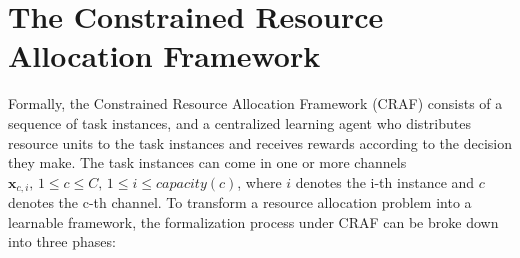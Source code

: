 \documentclass[conference]{IEEEtran}
\begin{document}
%
%
%
%
%


\section{The Constrained Resource Allocation Framework}

Formally, the Constrained Resource Allocation Framework (CRAF) consists of a sequence of task instances, and a centralized learning agent who distributes resource units to the task instances and receives rewards according to the decision they make. The task instances can come in one or more channels $\mathbf{x}_{c,i},\, 1\leq c \leq C,\, 1\leq i \leq capacity(c)$, where $i$ denotes the i-th instance and $c$ denotes the c-th channel. To transform a resource allocation problem into a learnable framework, the formalization process under CRAF can be broke down into three phases:
\end{document}
